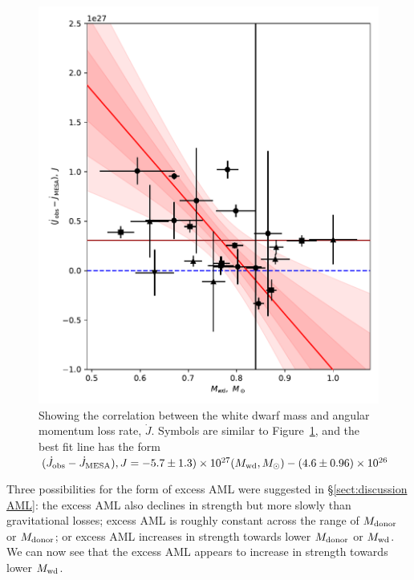 \begin{figure}
    \centering
    \includegraphics[width=\textwidth]{figures/results/Mdot/Mwd_Jdot_ex.pdf}
    \caption{Showing the correlation between the white dwarf mass and angular momentum loss rate, $\dot J$. Symbols are similar to Figure~\ref{fig:discussion:white dwarf mass vs Jdot fit}, and the best fit line has the form $(\dot J_{\rm obs} - \dot J_{\rm MESA}), J = -5.7\pm1.3) \times 10^{27}(M_{\rm wd}, M_\odot) - (4.6\pm0.96)\times10^{26}$}
    \label{fig:discussion:white dwarf mass vs Jdot fit}
\end{figure}


Three possibilities for the form of excess AML were suggested in \S\ref{sect:discussion AML}: the excess AML also declines in strength but more slowly than gravitational losses; excess AML is roughly constant across the range of $M_{\rm donor}$ or $M_{\rm donor}$; or excess AML increases in strength towards lower $M_{\rm donor}$ or $M_{\rm wd}$.
We can now see that the excess AML appears to increase in strength towards lower $M_{\rm wd}$.

